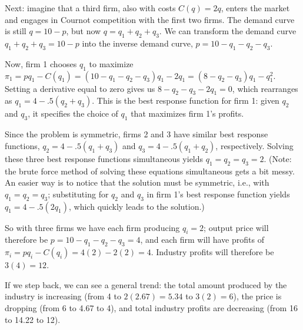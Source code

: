 Next: imagine that a third firm, also with costs $C(q)=2q$, enters the market and engages in Cournot competition with the first two firms. The demand curve is still $q=10-p$, but now $q=q_1+q_2+q_3$. We can transform the demand curve
$q_1+q_2+q_3=10-p$ into the inverse demand curve, $p=10-q_1-q_2-q_3$.

Now, firm 1 chooses $q_1$ to maximize $\pi_1=pq_1-C(q_1)=(10-q_1-q_2-q_3)q_1-2q_1=(8-q_2-q_3)q_1-q_1^2.$ Setting a derivative equal to zero gives us $8-q_2-q_3-2q_1=0$, which rearranges as $q_1=4-.5(q_2+q_3)$. This is the best response function for firm 1: given $q_2$ and $q_3$, it specifies the choice of $q_1$ that maximizes firm 1's profits.

Since the problem is symmetric, firms 2 and 3 have similar best response functions, $q_2=4-.5(q_1+q_3)$ and $q_3=4-.5(q_1+q_2)$, respectively. Solving these three best response functions simultaneous yields $q_1=q_2=q_3=2$. (Note: the brute force method of solving these equations simultaneous gets a bit messy. An easier way is to notice that the solution must be symmetric, i.e., with $q_1=q_2=q_3$; substituting for $q_2$ and $q_3$ in firm 1's best response function yields $q_1=4-.5(2q_1)$, which quickly leads to the solution.)

So with three firms we have each firm producing $q_i=2$; output price will therefore be $p=10-q_1-q_2-q_3=4$, and each firm will have profits of $\pi_i=pq_i-C(q_i)=4(2)-2(2)=4.$ Industry profits will therefore be $3(4)=12$.

If we step back, we can see a general trend: the total amount produced by the industry is increasing (from 4 to $2(2.67)=5.34$ to $3(2)=6$), the price is dropping (from 6 to 4.67 to 4), and total industry profits are decreasing (from 16 to 14.22 to 12).

\enlargethispage{\baselineskip}

